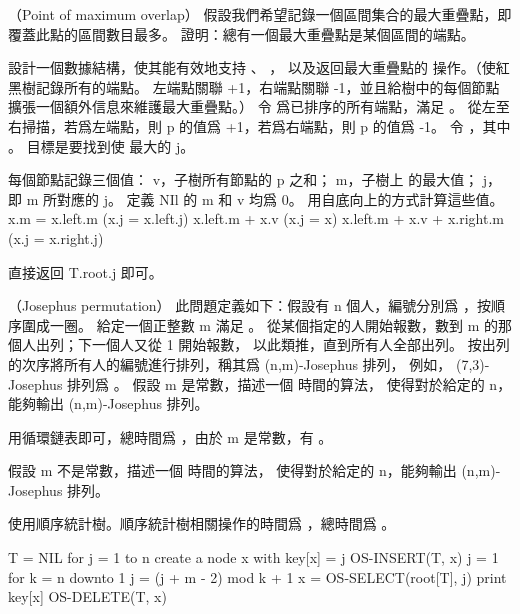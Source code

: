 \startsubject[
  title={Problems},
]

\startPROBLEM
（Point of maximum overlap）
假設我們希望記錄一個區間集合的{\EMP 最大重疊點}，即覆蓋此點的區間數目最多。
\startigBase[a]
\startitem
證明：總有一個最大重疊點是某個區間的端點。
\stopitem
\startANSWER
{}
\stopANSWER

\startitem
設計一個數據結構，使其能有效地支持 、 ，
以及返回最大重疊點的  操作。（\hint 使紅黑樹記錄所有的端點。
左端點關聯 +1，右端點關聯 -1，並且給樹中的每個節點擴張一個額外信息來維護最大重疊點。）
\stopitem
\startANSWER
令  爲已排序的所有端點，滿足 。
從左至右掃描，若爲左端點，則 p 的值爲 +1，若爲右端點，則 p 的值爲 -1。
令 ，其中 。
目標是要找到使  最大的 j。

每個節點記錄三個值： v，子樹所有節點的 p 之和； m，子樹上  的最大值；
 j，即 m 所對應的 j。
定義 NIl 的 m 和 v 均爲 0。
用自底向上的方式計算這些值。
\startformula
x.m = \startcases
\NC x.left.m	\NC (x.j = x.left.j) \NR
\NC x.left.m + x.v \NC (x.j = x) \NR
\NC x.left.m + x.v + x.right.m \NC (x.j = x.right.j) \NR
\stopcases
\stopformula

 直接返回 T.root.j 即可。
\stopANSWER
\stopigBase
\stopPROBLEM

\startPROBLEM
（Josephus permutation）
此問題定義如下：假設有 n 個人，編號分別爲 ，按順序圍成一圈。
給定一個正整數 m 滿足 。
從某個指定的人開始報數，數到 m 的那個人出列；下一個人又從 1 開始報數，
以此類推，直到所有人全部出列。
按出列的次序將所有人的編號進行排列，稱其爲 (n,m)-Josephus 排列，
例如， (7,3)-Josephus 排列爲 。
\startigBase[a]
\startitem
假設 m 是常數，描述一個  時間的算法，
使得對於給定的 n，能夠輸出 (n,m)-Josephus 排列。
\stopitem

\startANSWER
用循環鏈表即可，總時間爲 ，由於 m 是常數，有 。
\stopANSWER

\startitem
假設 m 不是常數，描述一個  時間的算法，
使得對於給定的 n，能夠輸出 (n,m)-Josephus 排列。
\stopitem

\startANSWER
使用順序統計樹。順序統計樹相關操作的時間爲 ，總時間爲 。

\startCLRS
T = NIL
for j = 1 to n
	create a node x with key[x] = j
	OS-INSERT(T, x)
j = 1
for k = n downto 1
	j = (j + m - 2) mod k + 1
	x = OS-SELECT(root[T], j)
	print key[x]
	OS-DELETE(T, x)
\stopCLRS
\stopANSWER
\stopigBase
\stopPROBLEM

\stopsubject%
